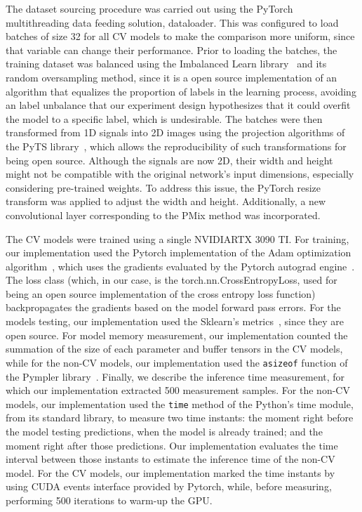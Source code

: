 \documentclass[final,3p,times,twocolumn]{elsarticle}
\begin{document}
The dataset sourcing procedure was carried out using the PyTorch multithreading data feeding solution, dataloader. This was configured to load batches of size 32 for all \gls{CV} models to make the comparison more uniform, since that variable can change their performance. Prior to loading the batches, the training dataset was balanced using the Imbalanced Learn library~\cite{ImbalancedLearn2017} and its random oversampling method, since it is a open source implementation of an algorithm that equalizes the proportion of labels in the learning process, avoiding an label unbalance that our experiment design hypothesizes that it could overfit the model to a specific label, which is undesirable. The batches were then transformed from 1D signals into 2D images using the projection algorithms of the PyTS library~\cite{PyTS}, which allows the reproducibility of such transformations for being open source. Although the signals are now 2D, their width and height might not be compatible with the original network's input dimensions, especially considering pre-trained weights. To address this issue, the PyTorch resize transform was applied to adjust the width and height. Additionally, a new convolutional layer corresponding to the \gls{PMix} method was incorporated.

The \gls{CV} models were trained using a single NVIDIA\texttrademark RTX 3090 TI. For training, our implementation used the Pytorch implementation of the Adam optimization algorithm~\cite{Adam}, which uses the gradients evaluated by the Pytorch autograd engine~\cite{pytorch}. The loss class (which, in our case, is the torch.nn.CrossEntropyLoss, used for being an open source implementation of the cross entropy loss function) backpropagates the gradients based on the model forward pass errors. For the models testing, our implementation used the Sklearn's metrics~\cite{Sklearn}, since they are open source. For model memory measurement, our implementation counted the summation of the size of each parameter and buffer tensors in the \gls{CV} models, while for the non-\gls{CV} models, our implementation used the \texttt{asizeof} function of the Pympler library~\cite{Pympler}. Finally, we describe the inference time measurement, for which our implementation extracted 500 measurement samples. For the non-\gls{CV} models, our implementation used the \texttt{time} method of the Python's time module, from its standard library, to measure two time instants: the moment right before the model testing predictions, when the model is already trained; and the moment right after those predictions. Our implementation evaluates the time interval between those instants to estimate the inference time of the non-\gls{CV} model. For the \gls{CV} models, our implementation marked the time instants by using CUDA events interface provided by Pytorch, while, before measuring, performing 500 iterations to warm-up the \gls{GPU}.
\end{document}
